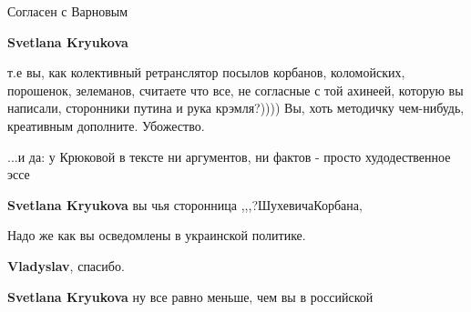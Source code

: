 \begin{itemize}
\begin{itemize}
Согласен с Варновым

 
\textbf{Svetlana Kryukova} 

т.е вы, как колективный ретранслятор посылов корбанов, коломойских, порошенок,
зелеманов, считаете что все, не согласные с той ахинеей, которую вы написали,
сторонники путина и рука крэмля?)))) Вы, хоть методичку чем-нибудь, креативным
дополните. Убожество.

 
...и да: у Крюковой в тексте ни аргументов, ни фактов - просто худодественное эссе

 
\textbf{Svetlana Kryukova} вы чья сторонница ,,,?ШухевичаКорбана,🤘🦧


 
Надо же как вы осведомлены в украинской политике.

 

\textbf{Vladyslav}, спасибо.

 
\textbf{Svetlana Kryukova} ну все равно меньше, чем вы в российской

 

\end{itemize}
\end{itemize}
